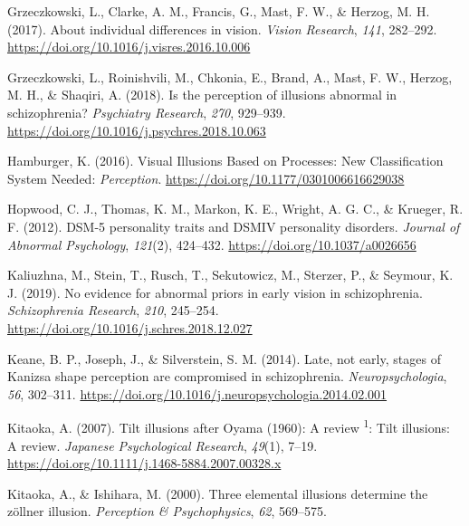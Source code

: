 \documentclass[
  man,floatsintext]{apa6}
\newlength{\cslhangindent}
\newlength{\cslentryspacingunit} %
\newenvironment{CSLReferences}[2] %
 {%
  \setlength{\parindent}{0pt}
  \ifodd #1
  \let\oldpar\par
  \def\par{\hangindent=\cslhangindent\oldpar}
  \fi
  \setlength{\parskip}{#2\cslentryspacingunit}
 }%
 {}
\begin{document}
\begin{CSLReferences}{1}{0}
\leavevmode{}%
Grzeczkowski, L., Clarke, A. M., Francis, G., Mast, F. W., \& Herzog, M. H. (2017). About individual differences in vision. \emph{Vision Research}, \emph{141}, 282--292. \url{https://doi.org/10.1016/j.visres.2016.10.006}

\leavevmode{}%
Grzeczkowski, L., Roinishvili, M., Chkonia, E., Brand, A., Mast, F. W., Herzog, M. H., \& Shaqiri, A. (2018). Is the perception of illusions abnormal in schizophrenia? \emph{Psychiatry Research}, \emph{270}, 929--939. \url{https://doi.org/10.1016/j.psychres.2018.10.063}

\leavevmode{}%
Hamburger, K. (2016). Visual Illusions Based on Processes: New Classification System Needed: \emph{Perception}. \url{https://doi.org/10.1177/0301006616629038}

\leavevmode{}%
Hopwood, C. J., Thomas, K. M., Markon, K. E., Wright, A. G. C., \& Krueger, R. F. (2012). DSM-5 personality traits and DSM{\textendash}IV personality disorders. \emph{Journal of Abnormal Psychology}, \emph{121}(2), 424--432. \url{https://doi.org/10.1037/a0026656}

\leavevmode{}%
Kaliuzhna, M., Stein, T., Rusch, T., Sekutowicz, M., Sterzer, P., \& Seymour, K. J. (2019). No evidence for abnormal priors in early vision in schizophrenia. \emph{Schizophrenia Research}, \emph{210}, 245--254. \url{https://doi.org/10.1016/j.schres.2018.12.027}

\leavevmode{}%
Keane, B. P., Joseph, J., \& Silverstein, S. M. (2014). Late, not early, stages of Kanizsa shape perception are compromised in schizophrenia. \emph{Neuropsychologia}, \emph{56}, 302--311. \url{https://doi.org/10.1016/j.neuropsychologia.2014.02.001}

\leavevmode{}%
Kitaoka, A. (2007). Tilt illusions after Oyama (1960): A review {\textsuperscript{1}}: Tilt illusions: A review. \emph{Japanese Psychological Research}, \emph{49}(1), 7--19. \url{https://doi.org/10.1111/j.1468-5884.2007.00328.x}

\leavevmode{}%
Kitaoka, A., \& Ishihara, M. (2000). Three elemental illusions determine the zöllner illusion. \emph{Perception \& Psychophysics}, \emph{62}, 569--575.


\end{CSLReferences}
\end{document}
